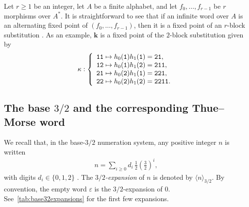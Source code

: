 \documentclass[12pt,reqno]{article}
\begin{document}
Let $r\ge 1$ be an integer, let $A$ be a finite alphabet, and let $f_0,\ldots,f_{r-1}$ be $r$ morphisms over $A^*$. It is straightforward to see that if an infinite word over $A$ is an alternating fixed point of $(f_0,\ldots,f_{r-1})$, then it is a fixed point of an $r$-block substitution \cite{RigSti1}.  As an example,  $\mathbf{k}$ is a fixed point of the $2$-block substitution given by 
\[
  \kappa:\left\{
  \begin{array}{l}
    {\tt 11}\mapsto h_0({\tt 1})h_1({\tt 1})={\tt 21},\\
    {\tt 12}\mapsto h_0({\tt 1})h_1({\tt 2})={\tt 211},\\
    {\tt 21}\mapsto h_0({\tt 2})h_1({\tt 1})={\tt 221},\\
    {\tt 22}\mapsto h_0({\tt 2})h_1({\tt 2})={\tt 2211}.\\
  \end{array}\right.
\]


\subsection{The base $3/2$ and the corresponding Thue--Morse word}\label{ssec:32TM}

We recall that, in the base-$3/2$ numeration system, any positive integer $n$ is written
\begin{align}
\label{eq: 32expansions}
  n=\sum_{i\ge 0}d_i\, \frac{1}{2}\left(\frac{3}{2}\right)^i,
\end{align}
with digits $d_i\in\{0,1,2\}$ \cite{AFS}. The \emph{$3/2$-expansion} of $n$ is denoted by $\langle n \rangle_{3/2}$. By convention, the empty word $\varepsilon$ is the $3/2$-expansion of $0$.
See~\cref{tab:base32expansions} for the first few expansions.
\end{document}
